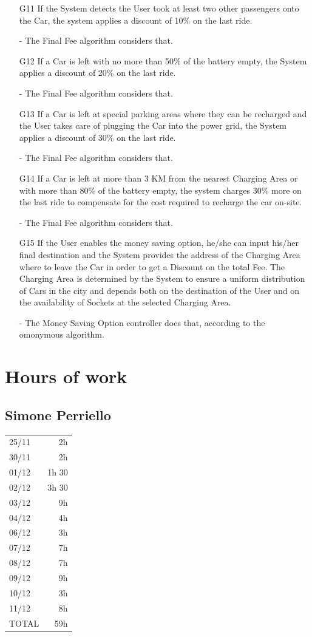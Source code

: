 \documentclass[12pt]{article}
\begin{document}
\begin{enumerate}
	\item[G11] If the System detects the User took at least two other passengers onto the Car, the system applies a discount of 10\% on the last ride.
	\item[-] The Final Fee algorithm considers that.
	\item[G12] If a Car is left with no more than 50\% of the battery empty, the System applies a discount of 20\% on the last ride.
	\item[-] The Final Fee algorithm considers that.
	\item[G13] If a Car is left at special parking areas where they can be recharged and the User takes care of plugging the Car into the power grid, the System applies a discount of 30\% on the last ride.
	\item[-] The Final Fee algorithm considers that.
	\item[G14] If a Car is left at more than 3 KM from the nearest Charging Area or with more than 80\% of the battery empty, the system charges 30\% more on the last ride to compensate for the cost required to recharge the car on-site.
	\item[-] The Final Fee algorithm considers that.
	\item[G15] If the User enables the money saving option, he/she can input his/her final destination and the System provides the address of the Charging Area where to leave the Car in order to get a Discount on the total Fee. The Charging Area is determined by the System to ensure a uniform distribution of Cars in the city and depends both on the destination of the User and on the availability of Sockets at the selected Charging Area.
	\item[-] The Money Saving Option controller does that, according to the omonymous algorithm.
\end{enumerate}

\clearpage
\section{Hours of work}
\subsection{Simone Perriello}
\begin{tabular}{l r}
25/11 & 2h\\
30/11 & 2h\\
01/12 & 1h 30\\
02/12 & 3h 30\\
03/12 & 9h\\
04/12 & 4h\\
06/12 & 3h\\
07/12 & 7h\\
08/12 & 7h\\
09/12 & 9h\\
10/12 & 3h\\
11/12 & 8h\\ \hline
TOTAL & 59h\\
\end{tabular}
\end{document}
